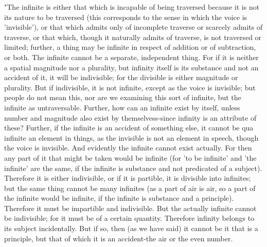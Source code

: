 "The infinite is either that which is incapable of being traversed
because it is not its nature to be traversed (this corresponds to
the sense in which the voice is 'invisible'), or that which admits
only of incomplete traverse or scarcely admits of traverse, or that
which, though it naturally admits of traverse, is not traversed or
limited; further, a thing may be infinite in respect of addition or
of subtraction, or both. The infinite cannot be a separate, independent
thing. For if it is neither a spatial magnitude nor a plurality, but
infinity itself is its substance and not an accident of it, it will
be indivisible; for the divisible is either magnitude or plurality.
But if indivisible, it is not infinite, except as the voice is invisible;
but people do not mean this, nor are we examining this sort of infinite,
but the infinite as untraversable. Further, how can an infinite exist
by itself, unless number and magnitude also exist by themselvess-since
infinity is an attribute of these? Further, if the infinite is an
accident of something else, it cannot be qua infinite an element in
things, as the invisible is not an element in speech, though the voice
is invisible. And evidently the infinite cannot exist actually. For
then any part of it that might be taken would be infinite (for 'to
be infinite' and 'the infinite' are the same, if the infinite is substance
and not predicated of a subject). Therefore it is either indivisible,
or if it is partible, it is divisible into infinites; but the same
thing cannot be many infinites (as a part of air is air, so a part
of the infinite would be infinite, if the infinite is substance and
a principle). Therefore it must be impartible and indivisible. But
the actually infinite cannot be indivisible; for it must be of a certain
quantity. Therefore infinity belongs to its subject incidentally.
But if so, then (as we have said) it cannot be it that is a principle,
but that of which it is an accident-the air or the even number.

